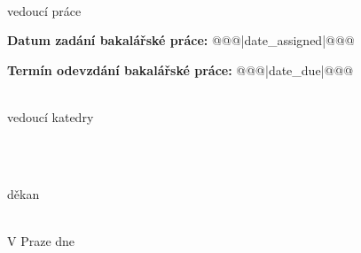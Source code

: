 \documentclass[a4paper,11pt,twoside,final]{article}
\begin{document}
\begin{titlepage}
\begin{minipage}{0.3\textwidth}
\begin{center}

\dotfill\\
    vedoucí práce
\end{center}
\end{minipage}

\vfill
\textbf{Datum zadání bakalářské práce:} @@@|date_assigned|@@@

\textbf{Termín odevzdání bakalářské práce:} @@@|date_due|@@@ \\[4cm]


\begin{minipage}{0.3\textwidth}
  \begin{center}\dotfill\\
      vedoucí katedry
  \end{center}
\end{minipage}
~\hfill
\begin{minipage}{0.3\textwidth}
  \begin{center}
  \dotfill\\
  děkan
  \end{center}
\end{minipage}
\\[2cm]

V Praze dne
\end{titlepage}
\end{document}
